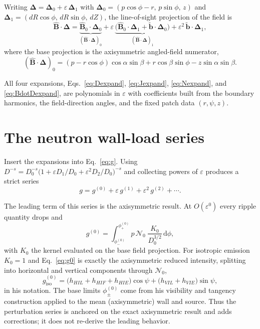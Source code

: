 \documentclass[11pt]{article}
\newcommand{\Del}{\bm{\Delta}}
\newcommand{\Bhat}{\hat{\bm{B}}}
\newcommand{\bperp}{\tilde{\bm{b}}}
\newcommand{\eps}{\varepsilon}
\newcommand{\dd}{\,\mathrm{d}}
\newcommand{\Order}[1]{O(\eps^{#1})}
\begin{document}
Writing $\Del=\Del_0+\eps\,\Del_1$ with $\Del_0=(p\cos\phi-r,\,p\sin\phi,\,z)$ and $\Del_1=(dR\cos\phi,\,dR\sin\phi,\,dZ)$, the line-of-sight projection of the field is
\begin{equation}
\Bhat\cdot\Del=\underbrace{\Bhat_0\cdot\Del_0}_{(\Bhat\cdot\Del)_0}
+\eps\,\underbrace{\big(\Bhat_0\cdot\Del_1+\bperp\cdot\Del_0\big)}_{(\Bhat\cdot\Del)_1}
+\eps^2\,\bperp\cdot\Del_1,
\label{eq:BdotDexpand}
\end{equation}
where the base projection is the axisymmetric angled-field numerator,
\begin{equation}
(\Bhat\cdot\Del)_0=(p-r\cos\phi)\cos\alpha\sin\beta+r\cos\beta\sin\phi-z\sin\alpha\sin\beta.
\label{eq:BdotD0}
\end{equation}

All four expansions, Eqs.~\eqref{eq:Dexpand}, \eqref{eq:Jexpand}, \eqref{eq:Nexpand}, and \eqref{eq:BdotDexpand}, are polynomials in $\eps$ with coefficients built from the boundary harmonics, the field-direction angles, and the fixed patch data $(r,\psi,z)$.

\section{The neutron wall-load series}
\label{sec:series}

Insert the expansions into Eq.~\eqref{eq:g}. Using $D^{-s}=D_0^{-s}\big(1+\eps D_1/D_0+\eps^2 D_2/D_0\big)^{-s}$ and collecting powers of $\eps$ produces a strict series
\begin{equation}
g=g^{(0)}+\eps\,g^{(1)}+\eps^2\,g^{(2)}+\cdots .
\label{eq:gseries}
\end{equation}

The leading term of this series is the axisymmetric result. At $\Order{0}$ every ripple quantity drops and
\begin{equation}
g^{(0)}=\int_{\phi_-^{(0)}}^{\phi_+^{(0)}}\! p\,\mathcal{N}_0\;\frac{K_0}{D_0^{3/2}}\dd\phi,
\label{eq:g0}
\end{equation}
with $K_0$ the kernel evaluated on the base field projection. For isotropic emission $K_0=1$ and Eq.~\eqref{eq:g0} is exactly the axisymmetric reduced intensity, splitting into horizontal and vertical components through $\mathcal{N}_0$,
\begin{equation}
g^{(0)}_{\mathrm{iso}}=\big(h_{HIL}+h_{HIF}+h_{HIE}\big)\cos\psi+\big(h_{VIL}+h_{VIE}\big)\sin\psi,
\end{equation}
in his notation. The base limits $\phi_\pm^{(0)}$ come from his visibility and tangency construction applied to the mean (axisymmetric) wall and source. Thus the perturbation series is anchored on the exact axisymmetric result and adds corrections; it does not re-derive the leading behavior.
\end{document}
